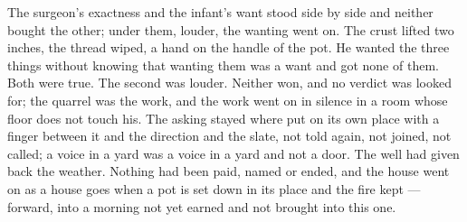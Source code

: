 The surgeon's exactness and the infant's want stood side by side and neither bought the other; under them, louder, the wanting went on. The crust lifted two inches, the thread wiped, a hand on the handle of the pot. He wanted the three things without knowing that wanting them was a want and got none of them. Both were true. The second was louder. Neither won, and no verdict was looked for; the quarrel was the work, and the work went on in silence in a room whose floor does not touch his. The asking stayed where put on its own place with a finger between it and the direction and the slate, not told again, not joined, not called; a voice in a yard was a voice in a yard and not a door. The well had given back the weather. Nothing had been paid, named or ended, and the house went on as a house goes when a pot is set down in its place and the fire kept --- forward, into a morning not yet earned and not brought into this one.
